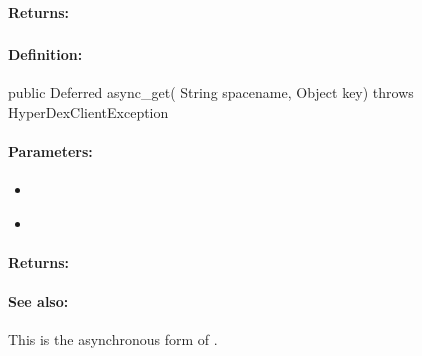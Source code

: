 \paragraph{Returns:}


\pagebreak
\subsubsection{}
\label{api:java:async_get}


\paragraph{Definition:}
\begin{javacode}
public Deferred async_get(
        String spacename,
        Object key) throws HyperDexClientException
\end{javacode}

\paragraph{Parameters:}
\begin{itemize}[noitemsep]
\item {}\\

\item {}\\

\end{itemize}

\paragraph{Returns:}


\paragraph{See also:}  This is the asynchronous form of .

\pagebreak
\subsubsection{}
\label{api:java:get_partial}


